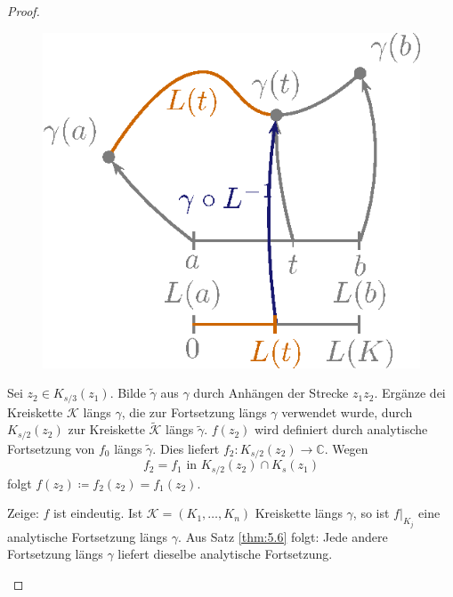 \documentclass[a4paper,10pt]{scrbook}
\begin{document}
\begin{notice}[Folgerung]
\begin{proof}
\begin{enum-arab}
      \begin{figure}[H]
        \centering
        \includegraphics[scale=0.2]{images/ana3-tmp-48}
      \end{figure}

      Sei $z_2 \in K_{s/3}(z_1)$. Bilde $\widetilde{\gamma}$ aus $\gamma$ durch Anhängen der Strecke $z_1 z_2$. Ergänze dei Kreiskette $\mathcal{K}$ längs $\gamma$, die zur Fortsetzung längs $\gamma$ verwendet wurde, durch $K_{s/2}(z_2)$ zur Kreiskette $\widetilde{\mathcal{K}}$ längs $\widetilde{\gamma}$. $f(z_2)$ wird definiert durch analytische Fortsetzung von $f_0$ längs $\widetilde{\gamma}$. Dies liefert $f_2 : K_{s/2}(z_2) \to \mathbb{C}$. Wegen \[ f_2 = f_1 \text{ in } K_{s/2}(z_2) \cap K_s(z_1) \] folgt $f(z_2) \coloneq f_2(z_2) = f_1(z_2)$.

      \item Zeige: $f$ ist eindeutig. Ist $\mathcal{K} = (K_1,\ldots,K_n)$ Kreiskette längs $\gamma$, so ist $f \Big|_{K_j}$ eine analytische Fortsetzung längs $\gamma$. Aus Satz \ref{thm:5.6} folgt: Jede andere Fortsetzung längs $\gamma$ liefert dieselbe analytische Fortsetzung.
    \end{enum-arab}
  \end{proof}
\end{notice}
\end{document}
